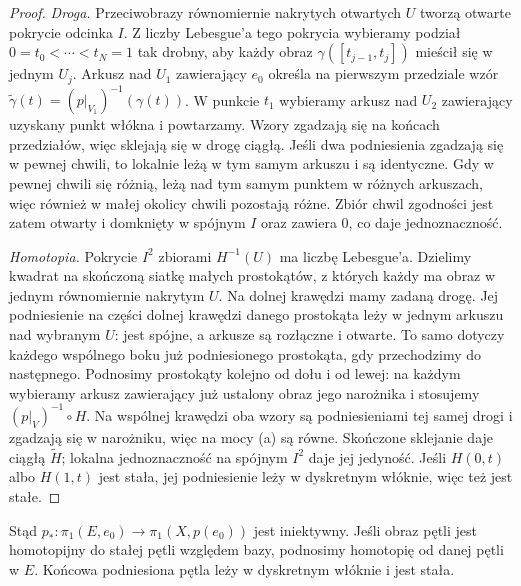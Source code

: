 \begin{proof}
\emph{Droga.} Przeciwobrazy równomiernie
nakrytych otwartych $U$ tworzą otwarte
pokrycie odcinka $I$. Z liczby Lebesgue'a
tego pokrycia wybieramy podział
$0=t_0<\cdots<t_N=1$ tak drobny, aby
każdy obraz $\gamma([t_{j-1},t_j])$
mieścił się w jednym $U_j$.
Arkusz nad $U_1$ zawierający $e_0$
określa na pierwszym przedziale wzór
$\widetilde\gamma(t)=(p|_{V_1})^{-1}(\gamma(t))$.
W punkcie $t_1$ wybieramy arkusz nad $U_2$
zawierający uzyskany punkt włókna i powtarzamy.
Wzory zgadzają się na końcach przedziałów,
więc sklejają się w drogę ciągłą.
Jeśli dwa podniesienia zgadzają się w pewnej
chwili, to lokalnie leżą w tym samym arkuszu
i są identyczne. Gdy w pewnej chwili
się różnią, leżą nad tym samym punktem
w różnych arkuszach, więc również w małej
okolicy chwili pozostają różne. Zbiór
chwil zgodności jest zatem otwarty
i domknięty w spójnym $I$ oraz
zawiera $0$, co daje jednoznaczność.

\emph{Homotopia.} Pokrycie $I^2$ zbiorami
$H^{-1}(U)$ ma liczbę Lebesgue'a.
Dzielimy kwadrat na skończoną siatkę
małych prostokątów, z których każdy ma
obraz w jednym równomiernie nakrytym $U$.
Na dolnej krawędzi mamy zadaną drogę.
Jej podniesienie na części dolnej krawędzi danego
prostokąta leży w jednym arkuszu nad wybranym $U$:
jest spójne, a arkusze są rozłączne i otwarte.
To samo dotyczy każdego wspólnego boku już podniesionego
prostokąta, gdy przechodzimy do następnego.
Podnosimy prostokąty kolejno od dołu i
od lewej: na każdym wybieramy arkusz
zawierający już ustalony obraz jego narożnika
i stosujemy $(p|_V)^{-1}\circ H$.
Na wspólnej krawędzi oba wzory są
podniesieniami tej samej drogi i zgadzają
się w narożniku, więc na mocy (a) są równe.
Skończone sklejanie daje ciągłą
$\widetilde H$; lokalna jednoznaczność
na spójnym $I^2$ daje jej jedyność.
Jeśli $H(0,t)$ albo $H(1,t)$ jest stała,
jej podniesienie leży w dyskretnym włóknie,
więc też jest stałe.
\end{proof}

Stąd $p_*:\pi_1(E,e_0)\to\pi_1(X,p(e_0))$
jest iniektywny. Jeśli obraz pętli jest
homotopijny do stałej pętli względem bazy,
podnosimy homotopię od danej pętli w $E$.
Końcowa podniesiona pętla leży w dyskretnym
włóknie i jest stała.

